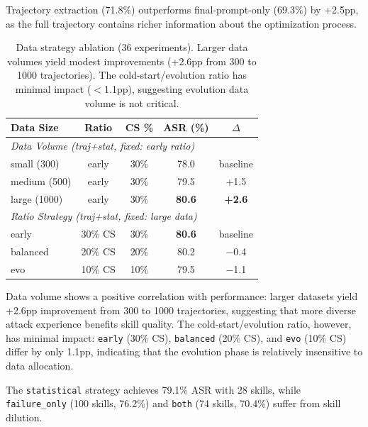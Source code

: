 \documentclass[letterpaper]{article}
\begin{document}
Trajectory extraction (71.8\%) outperforms final-prompt-only (69.3\%) by +2.5pp, as the full trajectory contains richer information about the optimization process.

\begin{table}[t]
\centering
\caption{Data strategy ablation (36 experiments). Larger data volumes yield modest improvements (+2.6pp from 300 to 1000 trajectories). The cold-start/evolution ratio has minimal impact ($<$1.1pp), suggesting evolution data volume is not critical.}
\label{tab:layer2}
\footnotesize
\setlength{\tabcolsep}{2.5pt}
\begin{tabular}{lcccc}
\toprule
\textbf{Data Size} & \textbf{Ratio} & \textbf{CS \%} & \textbf{ASR (\%)} & \textbf{$\Delta$} \\
\midrule
\multicolumn{5}{l}{\textit{Data Volume (traj+stat, fixed: early ratio)}} \\
small (300) & early & 30\% & 78.0 & baseline \\
medium (500) & early & 30\% & 79.5 & +1.5 \\
large (1000) & early & 30\% & \textbf{80.6} & \textbf{+2.6} \\
\midrule
\multicolumn{5}{l}{\textit{Ratio Strategy (traj+stat, fixed: large data)}} \\
early & 30\% CS & 30\% & \textbf{80.6} & baseline \\
balanced & 20\% CS & 20\% & 80.2 & $-$0.4 \\
evo & 10\% CS & 10\% & 79.5 & $-$1.1 \\
\bottomrule
\end{tabular}
\end{table}

Data volume shows a positive correlation with performance: larger datasets yield +2.6pp improvement from 300 to 1000 trajectories, suggesting that more diverse attack experience benefits skill quality. The cold-start/evolution ratio, however, has minimal impact: \texttt{early} (30\% CS), \texttt{balanced} (20\% CS), and \texttt{evo} (10\% CS) differ by only 1.1pp, indicating that the evolution phase is relatively insensitive to data allocation.

The \texttt{statistical} strategy achieves 79.1\% ASR with 28 skills, while \texttt{failure\_only} (100 skills, 76.2\%) and \texttt{both} (74 skills, 70.4\%) suffer from skill dilution.
\end{document}
